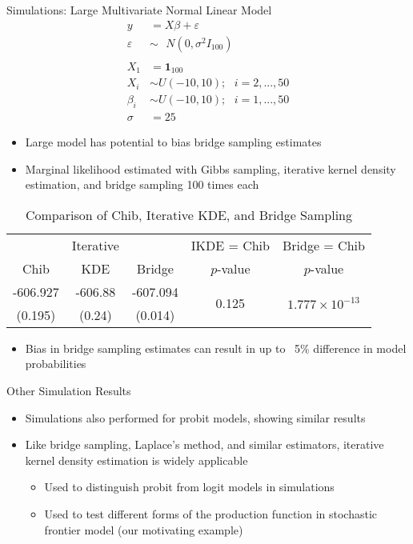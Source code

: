 \documentclass{beamer}
\newcommand{\ep}{\varepsilon}
\begin{document}
\begin{frame}{Simulations: Large Multivariate Normal Linear Model}
\begin{subequations}
	\begin{align}
	y &= X\beta + \ep \\
	\ep &\sim \mbox{ }N(0, \sigma^2 I_{100})\\
	\mbox{\ } \\
	X_1 &= \mathbf{1}_{100}\\
	X_i &\sim U(-10, 10); \mbox{\ \ \ \ } i = 2, ..., 50\\
	\beta_i &\sim U(-10, 10); \mbox{\ \ \ \ } i = 1, ..., 50\\
	\sigma &= 25
	\end{align}
\end{subequations}
\begin{itemize}
	\item Large model has potential to bias bridge sampling estimates
	\item Marginal likelihood estimated with Gibbs sampling, iterative kernel density estimation, and bridge sampling 100 times each
\end{itemize}
\end{frame}

\begin{frame}{}
\begin{table}
	\centering
	\begin{tabular}{c|c|c|c|c}
		& Iterative &  & IKDE = Chib & Bridge = Chib \\ 
		Chib & KDE & Bridge & $p$-value & $p$-value \\ 
		\hline
		\hline
		-606.927 & -606.88 & -607.094 & \multirow{2}{*}{0.125} & \multirow{2}{*}{$1.777\times 10^{-13}$} \\ 
		(0.195) & (0.24) & (0.014) &  &  \\ 
		\hline
	\end{tabular}
	\caption{Comparison of Chib, Iterative KDE, and Bridge Sampling} 
	\label{tab:bridge}
\end{table}
\begin{itemize}
	\item Bias in bridge sampling estimates can result in up to ~5\% difference in model probabilities
\end{itemize}
\end{frame}

\begin{frame}{Other Simulation Results}
\begin{itemize}
	\item Simulations also performed for probit models, showing similar results
	\item Like bridge sampling, Laplace's method, and similar estimators, iterative kernel density estimation is widely applicable
		\begin{itemize}
			\item Used to distinguish probit from logit models in simulations
			\item Used to test different forms of the production function in stochastic frontier model (our motivating example)
		\end{itemize}
\end{itemize}
\end{frame}
\end{document}
